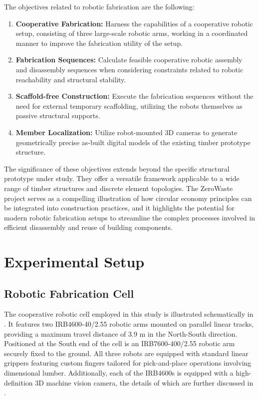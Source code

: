         The objectives related to robotic fabrication are the following:
        \begin{enumerate}
            \item \textbf{Cooperative Fabrication:} Harness the capabilities of a cooperative robotic setup, consisting of three large-scale robotic arms, working in a coordinated manner to improve the fabrication utility of the setup.
            \item \textbf{Fabrication Sequences:} Calculate feasible cooperative robotic assembly and disassembly sequences when considering constraints related to robotic reachability and structural stability.
            \item \textbf{Scaffold-free Construction:} Execute the fabrication sequences without the need for external temporary scaffolding, utilizing the robots themselves as passive structural supports.
            \item \textbf{Member Localization:} Utilize robot-mounted 3D cameras to generate geometrically precise as-built digital models of the existing timber prototype structure.
        \end{enumerate}
        
        The significance of these objectives extends beyond the specific structural prototype under study. They offer a versatile framework applicable to a wide range of timber structures and discrete element topologies. The ZeroWaste project serves as a compelling illustration of how circular economy principles can be integrated into construction practices, and it highlights the potential for modern robotic fabrication setups to streamline the complex processes involved in efficient disassembly and reuse of building components.

        
\section{Experimental Setup} \label{sec:3_experimental_setup}
    
\subsection{Robotic Fabrication Cell}
    The cooperative robotic cell employed in this study is illustrated schematically in . It features two IRB4600-40/2.55 robotic arms mounted on parallel linear tracks, providing a maximum travel distance of 3.9 m in the North-South direction. Positioned at the South end of the cell is an IRB7600-400/2.55 robotic arm securely fixed to the ground. All three robots are equipped with standard linear grippers featuring custom fingers tailored for pick-and-place operations involving dimensional lumber. Additionally, each of the IRB4600s is equipped with a high-definition 3D machine vision camera, the details of which are further discussed in .
    
